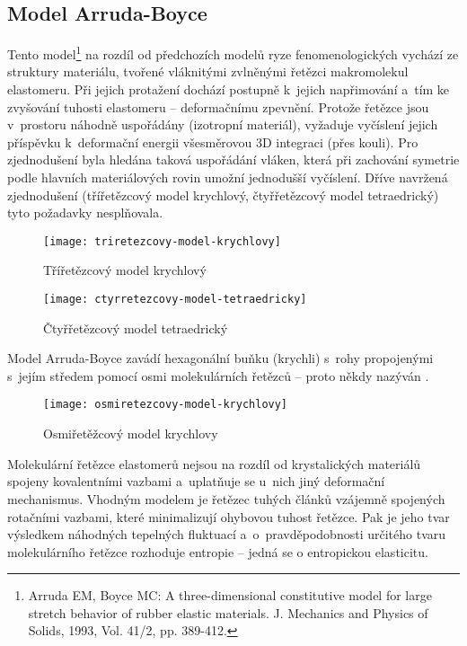 
\subsection{Model Arruda-Boyce}\label{sec:arruda-boyce}
Tento model\footnote{Arruda EM, Boyce  MC: A three-dimensional constitutive model for large stretch behavior of rubber elastic materials. J. Mechanics and Physics of Solids, 1993, Vol. 41/2, pp. 389-412.} na rozdíl od předchozích modelů ryze fenomenologických vychází ze struktury materiálu, tvořené vláknitými zvlněnými řetězci makromolekul elastomeru.
Při jejich protažení dochází postupně k~jejich napřimování a~tím ke zvyšování tuhosti elastomeru -- deformačnímu zpevnění.
Protože řetězce jsou v~prostoru náhodně uspořádány (izotropní materiál), vyžaduje vyčíslení jejich příspěvku k~deformační energii všesměrovou 3D integraci (přes kouli).
Pro zjednodušení byla hledána taková uspořádání vláken, která při zachování symetrie podle hlavních materiálových rovin umožní jednodušší vyčíslení.
Dříve navržená zjednodušení (třířetězcový model krychlový, čtyřřetězcový model tetraedrický) tyto požadavky nesplňovala.

\begin{figure}[H]
	\centering
	\texttt{[image: triretezcovy-model-krychlovy]}
	\caption{Třířetězcový model krychlový}
	\label{fig:triretezcovy-model-krychlovy}
\end{figure}

\begin{figure}[H]
	\centering
	\texttt{[image: ctyrretezcovy-model-tetraedricky]}
	\caption{Čtyřřetězcový model tetraedrický}
	\label{fig:ctyrretezcovy-model-tetraedricky}
\end{figure}

Model Arruda-Boyce zavádí hexagonální buňku (krychli) s~rohy propojenými s~jejím středem pomocí osmi molekulárních řetězců -- proto někdy nazýván .

\begin{figure}[H]
	\centering
	\texttt{[image: osmiretezcovy-model-krychlovy]}
	\caption{Osmiřetěžcový model krychlovy}
	\label{fig:osmiretezcovy-model-krychlovy}
\end{figure}

Molekulární řetězce elastomerů nejsou na rozdíl od krystalických materiálů spojeny kovalentními vazbami a~uplatňuje se u~nich jiný deformační mechanismus.
Vhodným modelem je řetězec tuhých článků vzájemně spojených rotačními vazbami, které minimalizují ohybovou tuhost řetězce.
Pak je jeho tvar výsledkem náhodných tepelných fluktuací a~o~pravděpodobnosti určitého tvaru molekulárního řetězce rozhoduje entropie -- jedná se o entropickou elasticitu.

